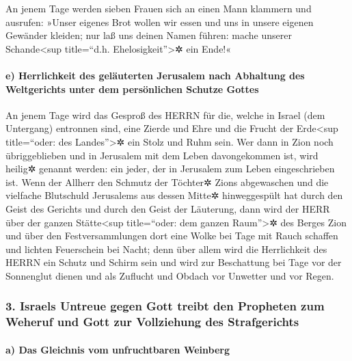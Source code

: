An jenem Tage werden sieben Frauen sich an einen Mann
klammern und ausrufen: »Unser eigenes Brot wollen wir essen und uns in
unsere eigenen Gewänder kleiden; nur laß uns deinen Namen führen: mache
unserer Schande\textless sup title=``d.h. Ehelosigkeit''\textgreater✲
ein Ende!«

\hypertarget{e-herrlichkeit-des-geluxe4uterten-jerusalem-nach-abhaltung-des-weltgerichts-unter-dem-persuxf6nlichen-schutze-gottes}{%
\paragraph{e) Herrlichkeit des geläuterten Jerusalem nach Abhaltung des
Weltgerichts unter dem persönlichen Schutze
Gottes}\label{e-herrlichkeit-des-geluxe4uterten-jerusalem-nach-abhaltung-des-weltgerichts-unter-dem-persuxf6nlichen-schutze-gottes}}

An jenem Tage wird das Gesproß des HERRN für die, welche
in Israel (dem Untergang) entronnen sind, eine Zierde und Ehre und die
Frucht der Erde\textless sup title=``oder: des Landes''\textgreater✲ ein
Stolz und Ruhm sein. Wer dann in Zion noch übriggeblieben
und in Jerusalem mit dem Leben davongekommen ist, wird heilig✲ genannt
werden: ein jeder, der in Jerusalem zum Leben eingeschrieben ist.
Wenn der Allherr den Schmutz der Töchter✲ Zions
abgewaschen und die vielfache Blutschuld Jerusalems aus dessen Mitte✲
hinweggespült hat durch den Geist des Gerichts und durch den Geist der
Läuterung, dann wird der HERR über der ganzen
Stätte\textless sup title=``oder: dem ganzen Raum''\textgreater✲ des
Berges Zion und über den Festversammlungen dort eine Wolke bei Tage mit
Rauch schaffen und lichten Feuerschein bei Nacht; denn über allem wird
die Herrlichkeit des HERRN ein Schutz und Schirm sein und
wird zur Beschattung bei Tage vor der Sonnenglut dienen und als Zuflucht
und Obdach vor Unwetter und vor Regen.

\hypertarget{israels-untreue-gegen-gott-treibt-den-propheten-zum-weheruf-und-gott-zur-vollziehung-des-strafgerichts}{%
\subsubsection{3. Israels Untreue gegen Gott treibt den Propheten zum
Weheruf und Gott zur Vollziehung des
Strafgerichts}\label{israels-untreue-gegen-gott-treibt-den-propheten-zum-weheruf-und-gott-zur-vollziehung-des-strafgerichts}}

\hypertarget{a-das-gleichnis-vom-unfruchtbaren-weinberg}{%
\paragraph{a) Das Gleichnis vom unfruchtbaren
Weinberg}\label{a-das-gleichnis-vom-unfruchtbaren-weinberg}}

